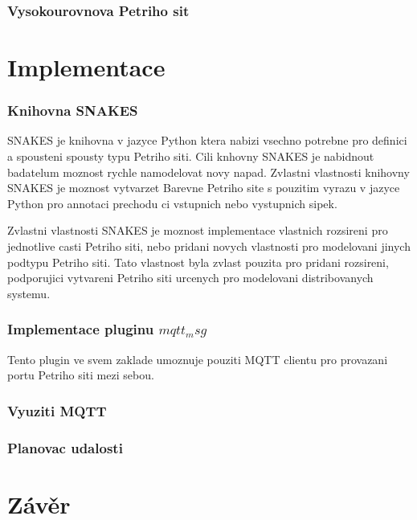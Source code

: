 \subsection*{Vysokourovnova Petriho sit}
\chapter{Implementace}
\subsection*{Knihovna SNAKES}
SNAKES je knihovna v jazyce Python ktera nabizi vsechno potrebne pro definici a spousteni spousty typu Petriho siti. Cili knhovny SNAKES je nabidnout badatelum moznost rychle namodelovat novy napad. Zvlastni vlastnosti knihovny SNAKES je moznost vytvarzet Barevne Petriho site s pouzitim vyrazu v jazyce Python pro annotaci prechodu ci vstupnich nebo vystupnich sipek.

Zvlastni vlastnosti SNAKES je moznost implementace vlastnich rozsireni pro jednotlive casti Petriho siti, nebo pridani novych vlastnosti pro modelovani jinych podtypu Petriho siti. Tato vlastnost byla zvlast pouzita pro pridani rozsireni, podporujici vytvareni Petriho siti urcenych pro modelovani distribovanych systemu.
\subsection*{Implementace pluginu $mqtt_msg$}
Tento plugin ve svem zaklade umoznuje pouziti MQTT clientu pro provazani portu Petriho siti mezi sebou.
\subsection*{Vyuziti MQTT}
\subsection*{Planovac udalosti}
\chapter{Závěr}
\label{zaver}
